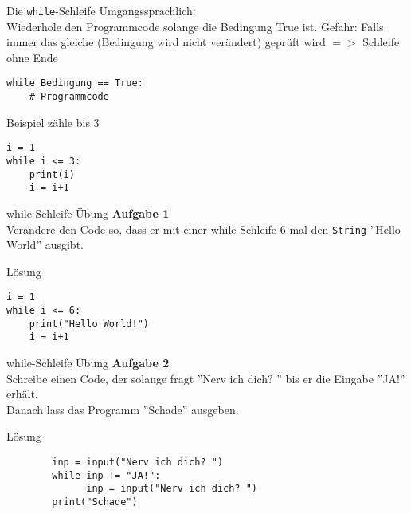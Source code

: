 \begin{frame}[fragile]{Die \texttt{while}-Schleife}
	Umgangssprachlich:\\
	Wiederhole den Programmcode solange die Bedingung True ist.
	Gefahr: Falls immer das gleiche (Bedingung wird nicht verändert) geprüft wird $=>$ Schleife ohne Ende

    \begin{lstlisting}
while Bedingung == True:
    # Programmcode

    \end{lstlisting}
    
    Beispiel zähle bis 3
    \begin{lstlisting}
i = 1
while i <= 3:
    print(i)
    i = i+1   
    \end{lstlisting}
   
\end{frame}

\begin{frame}[fragile]{while-Schleife Übung}
\textbf{Aufgabe 1}\\
	Verändere den Code so, dass er mit einer while-Schleife 6-mal den \texttt{String} ''Hello World'' ausgibt.

\pause{}
\begin{exampleblock}{Lösung}
	\begin{lstlisting}		 
i = 1
while i <= 6:
	print("Hello World!")
	i = i+1   		
	\end{lstlisting}
\end{exampleblock}
\end{frame}

\begin{frame}[fragile]{while-Schleife Übung}
\textbf{Aufgabe 2}\\
	Schreibe einen Code, der solange fragt ''Nerv ich dich? '' bis er die Eingabe ''JA!'' erhält.\\
	Danach lass das Programm ''Schade'' ausgeben.
	

\pause{}
\begin{exampleblock}{Lösung}
	\begin{lstlisting}		 
		inp = input("Nerv ich dich? ")
		while inp != "JA!":
			  inp = input("Nerv ich dich? ")
		print("Schade")	
	\end{lstlisting}
\end{exampleblock}
\end{frame}



